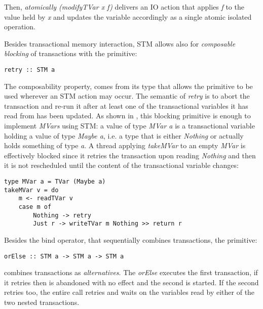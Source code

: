 Then, \emph{atomically (modifyTVar x f)} delivers an IO action that applies \emph{f} to the value held by \emph{x} and updates the variable accordingly as a single atomic isolated operation.

Besides transactional memory interaction, STM allows also for \emph{composable blocking} of transactions with the primitive:

\begin{lstlisting}
retry :: STM a
\end{lstlisting}

The composability property, comes from its type that allows the primitive to be used wherever an STM action may occur.
The semantic of \emph{retry} is to abort the transaction and re-run it after at least one of the transactional variables it has read from has been updated.
As shown in \cite{Harris:2005:CMT:1065944.1065952}, this blocking primitive is enough to implement \emph{MVars} using STM: a value of type \emph{MVar a} is a transactional variable holding a value of type \emph{Maybe a}, i.e. a type that is either \emph{Nothing} or actually holds something of type \emph{a}. A thread applying \emph{takeMVar} to an empty \emph{MVar} is effectively blocked since it retries the transaction upon reading \emph{Nothing} and then it is not rescheduled until the content of the transactional variable changes:

\begin{lstlisting}
type MVar a = TVar (Maybe a)
takeMVar v = do
    m <- readTVar v
    case m of
        Nothing -> retry
        Just r -> writeTVar m Nothing >> return r
\end{lstlisting}

Besides the bind operator, that sequentially combines transactions, the primitive:
\begin{lstlisting}
orElse :: STM a -> STM a -> STM a
\end{lstlisting}
combines transactions as \emph{alternatives}. The \emph{orElse} executes the first transaction, if it retries then is abandoned with no effect and the second is started. If the second retries too, the entire call retries and waits on the variables read by either of the two nested transactions.  
